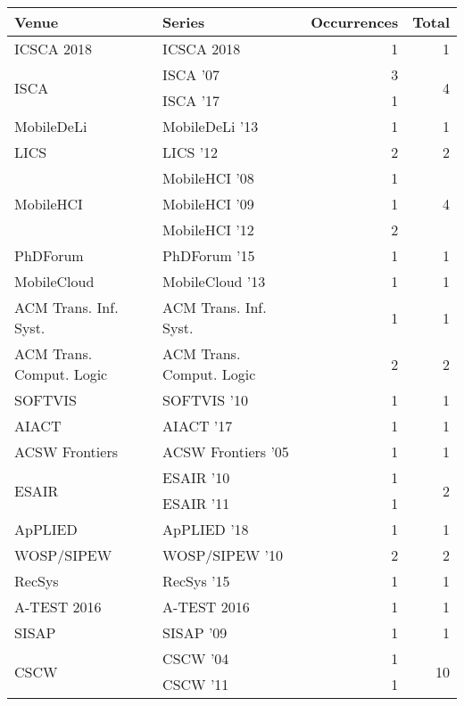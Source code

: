 \begin{table*}[t]
\begin{tabular}{llrr}
Venue & Series & Occurrences & Total\\\hline
\multirow{1}{*}{ICSCA 2018} & ICSCA 2018 & 1 & \multirow{1}{*}{1}\\
\multirow{2}{*}{ISCA } & ISCA '07 & 3 & \multirow{2}{*}{4}\\
& ISCA '17 & 1 &\\
\multirow{1}{*}{MobileDeLi } & MobileDeLi '13 & 1 & \multirow{1}{*}{1}\\
\multirow{1}{*}{LICS } & LICS '12 & 2 & \multirow{1}{*}{2}\\
\multirow{3}{*}{MobileHCI } & MobileHCI '08 & 1 & \multirow{3}{*}{4}\\
& MobileHCI '09 & 1 &\\
& MobileHCI '12 & 2 &\\
\multirow{1}{*}{PhDForum } & PhDForum '15 & 1 & \multirow{1}{*}{1}\\
\multirow{1}{*}{MobileCloud } & MobileCloud '13 & 1 & \multirow{1}{*}{1}\\
\multirow{1}{*}{ACM Trans. Inf. Syst.} & ACM Trans. Inf. Syst. & 1 & \multirow{1}{*}{1}\\
\multirow{1}{*}{ACM Trans. Comput. Logic} & ACM Trans. Comput. Logic & 2 & \multirow{1}{*}{2}\\
\multirow{1}{*}{SOFTVIS } & SOFTVIS '10 & 1 & \multirow{1}{*}{1}\\
\multirow{1}{*}{AIACT } & AIACT '17 & 1 & \multirow{1}{*}{1}\\
\multirow{1}{*}{ACSW Frontiers } & ACSW Frontiers '05 & 1 & \multirow{1}{*}{1}\\
\multirow{2}{*}{ESAIR } & ESAIR '10 & 1 & \multirow{2}{*}{2}\\
& ESAIR '11 & 1 &\\
\multirow{1}{*}{ApPLIED } & ApPLIED '18 & 1 & \multirow{1}{*}{1}\\
\multirow{1}{*}{WOSP/SIPEW } & WOSP/SIPEW '10 & 2 & \multirow{1}{*}{2}\\
\multirow{1}{*}{RecSys } & RecSys '15 & 1 & \multirow{1}{*}{1}\\
\multirow{1}{*}{A-TEST 2016} & A-TEST 2016 & 1 & \multirow{1}{*}{1}\\
\multirow{1}{*}{SISAP } & SISAP '09 & 1 & \multirow{1}{*}{1}\\
\multirow{7}{*}{CSCW } & CSCW '04 & 1 & \multirow{7}{*}{10}\\
& CSCW '11 & 1 &\\

\end{tabular}
\end{table*}
